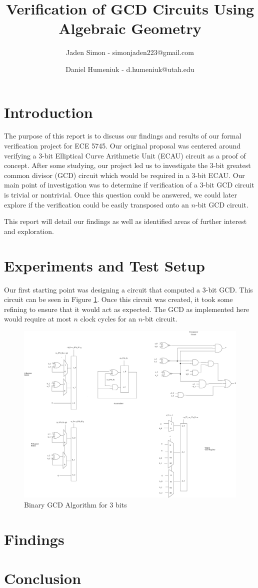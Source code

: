 \documentclass[12pt]{report}
\title{Verification of GCD Circuits Using Algebraic Geometry}
\author{Jaden Simon - simonjaden223@gmail.com \\ \and
	   Daniel Humeniuk - d.humeniuk@utah.edu}
\begin{document}
\maketitle

\section{Introduction}

The purpose of this report is to discuss our findings and results of our formal verification project for ECE 5745. Our original proposal was centered around verifying a 3-bit Elliptical Curve Arithmetic Unit (ECAU) circuit as a proof of concept. After some studying, our project led us to investigate the 3-bit greatest common divisor (GCD) circuit which would be required in a 3-bit ECAU. Our main point of investigation was to determine if verification of a 3-bit GCD circuit is trivial or nontrivial. Once this question could be answered, we could later explore if the verification could be easily transposed onto an $n$-bit GCD circuit.

This report will detail our findings as well as identified areas of further interest and exploration.

\section{Experiments and Test Setup}

Our first starting point was designing a circuit that computed a 3-bit GCD. This circuit can be seen in Figure \ref{fig:gcd}. Once this circuit was created, it took some refining to ensure that it would act as expected. The GCD as implemented here would require at most $n$ clock cycles for an $n$-bit circuit. 

\begin{figure}
\includegraphics[scale=0.35]{images/gcd_page.png}
\caption{Binary GCD Algorithm for $3$ bits}
\label{fig:gcd}
\end{figure}

\section{Findings}

\section{Conclusion}



%
\end{document}
